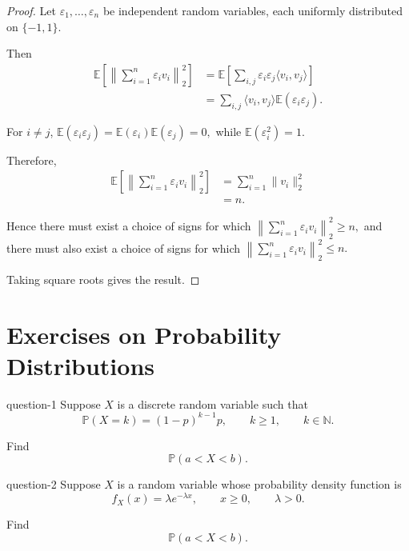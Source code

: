 \begin{proof}

Let
\(
\varepsilon_1,\ldots,\varepsilon_n
\)
be independent random variables, each uniformly distributed on
$\{-1,1\}$.

Then
\[
\begin{aligned}
\mathbb{E}
\left[
\left\|
\sum_{i=1}^n\varepsilon_i v_i
\right\|_2^2
\right]
&=
\mathbb{E}
\left[
\sum_{i,j}
\varepsilon_i\varepsilon_j
\langle v_i,v_j\rangle
\right]\\
&=
\sum_{i,j}
\langle v_i,v_j\rangle
\mathbb{E}(\varepsilon_i\varepsilon_j).
\end{aligned}
\]

For $i\neq j$,
\(
\mathbb{E}(\varepsilon_i\varepsilon_j)
=
\mathbb{E}(\varepsilon_i)
\mathbb{E}(\varepsilon_j)
=
0,
\)
while
\(
\mathbb{E}(\varepsilon_i^2)=1.
\)

Therefore,
\[
\begin{aligned}
\mathbb{E}
\left[
\left\|
\sum_{i=1}^n\varepsilon_i v_i
\right\|_2^2
\right]
&=
\sum_{i=1}^n
\|v_i\|_2^2\\
&=
n.
\end{aligned}
\]

Hence there must exist a choice of signs for which
\(
\left\|
\sum_{i=1}^n\varepsilon_i v_i
\right\|_2^2
\geq n,
\)
and there must also exist a choice of signs for which
\(
\left\|
\sum_{i=1}^n\varepsilon_i v_i
\right\|_2^2
\leq n.
\)

Taking square roots gives the result.

\end{proof}


\section{Exercises on Probability Distributions}

\begin{question}{}{question-1}
Suppose $X$ is a discrete random variable such that
\[
\mathbb{P}(X=k)
=
(1-p)^{k-1}p,
\qquad
k\geq 1,
\qquad
k\in\mathbb{N}.
\]

Find
\[
\mathbb{P}(a<X<b).
\]
\end{question}


\begin{question}{}{question-2}
Suppose $X$ is a random variable whose probability density
function is
\[
f_X(x)
=
\lambda e^{-\lambda x},
\qquad
x\geq0,
\qquad
\lambda>0.
\]

Find
\[
\mathbb{P}(a<X<b).
\]
\end{question}


